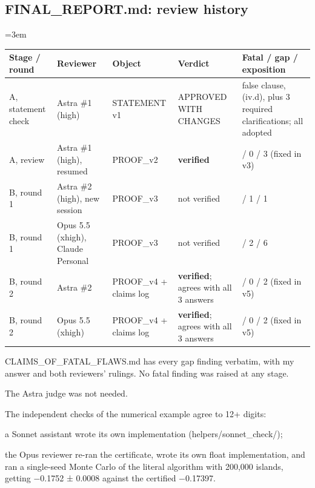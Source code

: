 \documentclass[11pt]{report}
\newenvironment{mdblock}{\begingroup\mdfont\raggedright\setlength{\parindent}{0pt}\setlength{\parskip}{0.55em}\emergencystretch=3em}{\par\endgroup}
\newcommand{\mdhead}[2]{\par\vspace{0.7em}\noindent{\bfseries\ifcase#1\or\large\or\normalsize\or\normalsize\or\small\or\small\or\small\fi #2}\par\nopagebreak\vspace{0.1em}}
\newcommand{\mdsubsec}[1]{\phantomsection\subsection*{#1}}
\begin{document}
\mdsubsec{FINAL\_REPORT.md: review history}
\begin{mdblock}
\mdhead{2}{Review history}

{\small
\begin{longtable}{|>{\raggedright\arraybackslash}p{}|>{\raggedright\arraybackslash}p{}|>{\raggedright\arraybackslash}p{}|>{\raggedright\arraybackslash}p{}|>{\raggedright\arraybackslash}p{}|}
\hline
\textbf{Stage / round} & \textbf{Reviewer} & \textbf{Object} & \textbf{Verdict} & \textbf{Fatal / gap / exposition} \\ \hline\endhead
A, statement check & Astra \#1 (high) & STATEMENT v1 & APPROVED WITH CHANGES & 1 false clause, (iv.d), plus 3 required clarifications; all adopted \\ \hline
A, review & Astra \#1 (high), resumed & PROOF\_v2 & \textbf{verified} & 0 / 0 / 3 (fixed in v3) \\ \hline
B, round 1 & Astra \#2 (high), new session & PROOF\_v3 & not verified & 0 / 1 / 1 \\ \hline
B, round 1 & Opus 5.5 (xhigh), Claude Personal & PROOF\_v3 & not verified & 0 / 2 / 6 \\ \hline
B, round 2 & Astra \#2 & PROOF\_v4 + claims log & \textbf{verified}; agrees with all 3 answers & 0 / 0 / 2 (fixed in v5) \\ \hline
B, round 2 & Opus 5.5 (xhigh) & PROOF\_v4 + claims log & \textbf{verified}; agrees with all 3 answers & 0 / 0 / 2 (fixed in v5) \\ \hline
\end{longtable}}

\begin{mdbul}
\item CLAIMS\_OF\_FATAL\_FLAWS.md has every gap finding verbatim, with my answer and both reviewers' rulings. No fatal finding was raised at any stage.
\item The Astra judge was not needed.
\item The independent checks of the numerical example agree to 12+ digits:

\begin{mdbul}
\item a Sonnet assistant wrote its own implementation (helpers/sonnet\_check/);
\item the Opus reviewer re-ran the certificate, wrote its own float implementation, and ran a single-seed Monte Carlo of the literal algorithm with 200,000 islands, getting −0.1752 ± 0.0008 against the certified −0.17397.
\end{mdbul}
\end{mdbul}
\end{mdblock}
\end{document}
